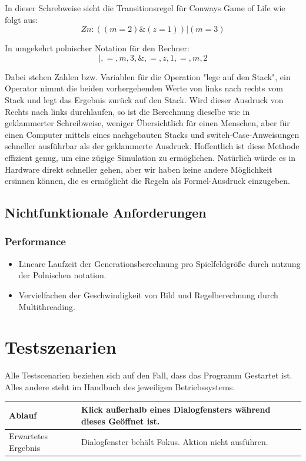 \documentclass[11pt,a4paper]{article}
\begin{document}
\par
In dieser Schrebweise sieht die Transitionsregel für Conways Game of Life wie folgt aus:
\[Zn : ((m=2)\&(z=1))|(m=3) \]
\par
In umgekehrt polnischer Notation für den Rechner:
\[|,=,m,3,\&,=,z,1,=,m,2\]
\par
Dabei stehen Zahlen bzw. Variablen für die Operation "lege auf den Stack", ein Operator nimmt die beiden vorhergehenden Werte von links nach rechts vom Stack und legt das Ergebnis zurück auf den Stack.
Wird dieser Ausdruck von Rechts nach links durchlaufen, so ist die Berechnung dieselbe wie in geklammerter Schreibweise, weniger Übersichtlich für einen Menschen, aber für einen Computer mittels eines nachgebauten Stacks und switch-Case-Anweisungen schneller ausführbar als der geklammerte Ausdruck. Hoffentlich ist diese Methode effizient genug, um eine zügige Simulation zu ermöglichen. Natürlich würde es in Hardware direkt schneller gehen, aber wir haben keine andere Möglichkeit ersinnen können, die es ermöglicht die Regeln als Formel-Ausdruck einzugeben.

 
\subsection{Nichtfunktionale Anforderungen}
\subsubsection{Performance}
\begin{itemize}
    \item Lineare Laufzeit der Generationsberechnung pro Spielfeldgröße durch nutzung der Polnischen notation.
    \item Vervielfachen der Geschwindigkeit von Bild und Regelberechnung durch Multithreading.
\end{itemize}

\pagebreak

\section{Testszenarien}
Alle Testscenarien beziehen sich auf den Fall, dass das Programm Gestartet ist. Alles andere steht im Handbuch des jeweiligen Betriebssystems.

\begin{longtable}[m]{|m{3cm}|m{10cm}|}
\hline
Ablauf&Klick außerhalb eines Dialogfensters während dieses Geöffnet ist.\\
\hline
Erwartetes Ergebnis&Dialogfenster behält Fokus. Aktion nicht ausführen.\\
\hline
\end{longtable}
\end{document}
